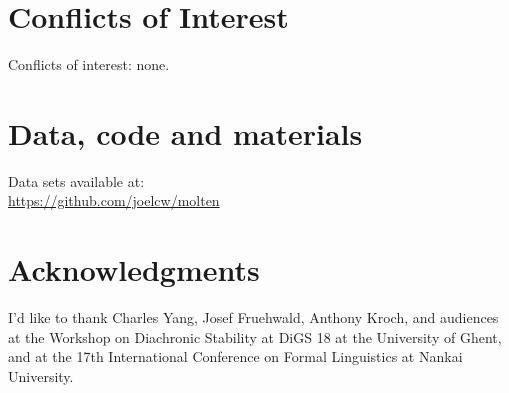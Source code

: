 \documentclass{artikel3}
\begin{document}
\section*{Conflicts of Interest}

Conflicts of interest: none.

\section*{Data, code and materials}

Data sets available at: \\
\url{https://github.com/joelcw/molten}\\


\section*{Acknowledgments}

I'd like to thank Charles Yang, Josef Fruehwald, Anthony Kroch, and audiences at  the Workshop on Diachronic Stability at DiGS 18 at the University of Ghent, and at the 17th International Conference on Formal Linguistics at Nankai University.






%

%
  

\pagebreak 
\end{document}
